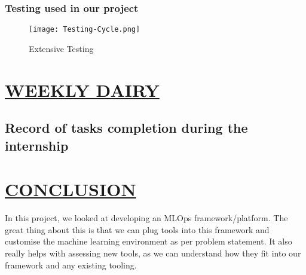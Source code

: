 \documentclass[12pt,oneside,a4paper]{report}
\begin{document}
\subsection{Testing used in our project}

\begin{figure}[h]
\centering
\texttt{[image: Testing-Cycle.png]}
\caption{Extensive Testing }
\label{fig_TestingCycle}
\end{figure}


\chapter{\underline{WEEKLY DAIRY}}\vspace{-15.0mm}
\section{Record of tasks completion during the internship}
\begin{table}[ht]
\centering
{}
\end{table}

\chapter{\underline{CONCLUSION}}
In this project, we looked at developing an MLOps framework/platform. The great thing about this is that we can plug tools into this framework and customise the machine learning environment as per problem statement. It also really helps with assessing new tools, as we can understand how they fit into our framework and any existing tooling. \vspace{5.0mm}
\end{document}
